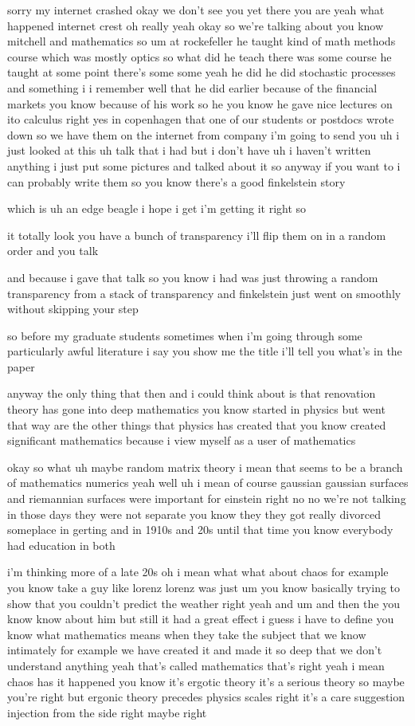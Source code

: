 \begin{description}
sorry my internet crashed okay we don't see you yet there you are yeah what happened internet crest oh really yeah okay so we're talking about you know mitchell and mathematics so um at rockefeller he taught kind of math methods course which was mostly optics so what did he teach there was some course he taught at some point there's some some yeah he did he did stochastic processes and something i i remember well that he did earlier because of the financial markets you know because of his work so he you know he gave nice lectures on ito calculus right yes in copenhagen that one of our students or postdocs wrote down so we have them on the internet from company i'm going to send you uh i just looked at this uh talk that i had but i don't have uh i haven't written anything i just put some pictures and talked about it so anyway if you want to i can probably write them so you know there's a good finkelstein story

which is uh an edge beagle i hope i get i'm getting it right so

it totally look you have a bunch of transparency i'll flip them on in a random order and you talk

and because i gave that talk so you know i had was just throwing a random transparency from a stack of transparency and finkelstein just went on smoothly without skipping your step

so before my graduate students sometimes when i'm going through some particularly awful literature i say you show me the title i'll tell you what's in the paper

anyway the only thing that then and i could think about is that renovation theory has gone into deep mathematics you know started in physics but went that way are the other things that physics has created that you know created significant mathematics because i view myself as a user of mathematics

okay so what uh maybe random matrix theory i mean that seems to be a branch of mathematics numerics yeah well uh i mean of course gaussian gaussian surfaces and riemannian surfaces were important for einstein right no no we're not talking in those days they were not separate you know they they got really divorced someplace in gerting and in 1910s and 20s until that time you know everybody had education in both

i'm thinking more of a late 20s oh i mean what what about chaos for example you know take a guy like lorenz lorenz was just um you know basically trying to show that you couldn't predict the weather right yeah and um and then the you know know about him but still it had a great effect i guess i have to define you know what mathematics means when they take the subject that we know intimately for example we have created it and made it so deep that we don't understand anything yeah that's called mathematics that's right yeah i mean chaos has it happened you know it's ergotic theory it's a serious theory so maybe you're right but ergonic theory precedes physics scales right it's a care suggestion injection from the side right maybe right


\end{description}
